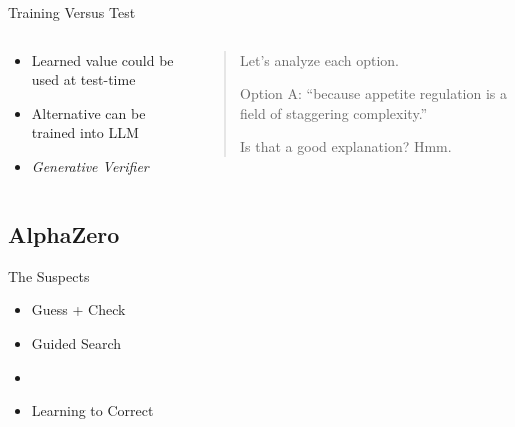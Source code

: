 \documentclass[14pt,aspectratio=169]{beamer}
\begin{document}
\begin{frame}{Training Versus Test}
	\begin{columns}
		\begin{column}{0.5\linewidth}
			\begin{itemize}
				\item Learned value could be used at test-time
				\item Alternative can be trained into LLM
				\item \textit{Generative Verifier} \cite{Zhang2024-sa}
			\end{itemize}
		\end{column}
		\begin{column}{0.5\linewidth}

			\begin{tcolorbox}[colback=white,colframe=black,boxrule=0.5pt]
				\begin{quote}

					Let’s analyze each option.
					\vspace{0.3cm}

					Option A: “because appetite regulation is a field of staggering complexity.”
					\vspace{0.3cm}

					Is that a good explanation? Hmm.
					\vspace{0.3cm}
				\end{quote}
			\end{tcolorbox}

		\end{column}
	\end{columns}
\end{frame}


\subsection{AlphaZero}
\begin{frame}{The Suspects}
	\begin{itemize}
		\item Guess + Check
		\item Guided Search
		\item {}
		\item Learning to Correct
	\end{itemize}
\end{frame}
\end{document}
